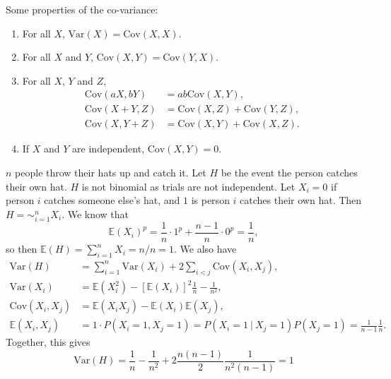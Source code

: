 \documentclass[letter-paper]{tufte-book}
\newenvironment{example}[1][Example]{\begin{trivlist}
\item[\hskip \labelsep {\bfseries #1}]}{\end{trivlist}}
\begin{document}
Some properties of the co-variance:
\begin{enumerate}
  \item For all $X$, $\mbox{Var}(X) = \mbox{Cov}(X,X)$.
  \item For all $X$ and $Y$, $\mbox{Cov}(X,Y) = \mbox{Cov}(Y,X)$.
  \item For all $X$, $Y$ and $Z$,
  \begin{align*}
    \mbox{Cov}(aX, bY) & = ab\mbox{Cov}(X,Y),\\
    \mbox{Cov}(X+Y, Z) & = \mbox{Cov}(X,Z) + \mbox{Cov}(Y,Z),\\
    \mbox{Cov}(X, Y+Z) & = \mbox{Cov}(X,Y) + \mbox{Cov}(X,Z).
  \end{align*}
  \item If $X$ and $Y$ are independent, $\mbox{Cov}(X,Y) = 0$.
\end{enumerate}

\begin{example}
  $n$ people throw their hats up and catch it. Let $H$ be the event the person
  catches their own hat. $H$ is not binomial as trials are not independent. Let
  $X_i = 0$ if person $i$ catches someone else's hat, and $1$ is person $i$
  catches their own hat. Then $H = \sim_{i=1}^n X_i$. We know that
  \begin{equation*}
    \mathbb{E}(X_i)^p = \frac{1}{n} \cdot 1^p + \frac{n-1}{n} \cdot 0^p
    = \frac{1}{n},
  \end{equation*}
  so then $\mathbb{E}(H) = \sum_{i=1}^n X_i = n/n = 1$. We also have
  \begin{align*}
    \mbox{Var}(H) 
      & = \sum_{i=1}^n \mbox{Var}(X_i) + 2\sum_{i<j}\mbox{Cov}(X_i, X_j), \\
    \mbox{Var}(X_i) 
      & = \mathbb{E}(X_i^2) - \left[\mathbb{E}(X_i)\right]^2
      \frac{1}{n} - \frac{1}{n^2}, \\
    \mbox{Cov}(X_i, X_j) 
      & = \mathbb{E}(X_i X_j) - \mathbb{E}(X_i)\mathbb{E}(X_j), \\
    \mathbb{E}(X_i, X_j) 
      & = 1\cdot P(X_i = 1, X_j = 1) = P(X_i = 1\ |\ X_j = 1)P(X_j = 1)
        = \frac{1}{n-1}\frac{1}{n}.
  \end{align*}
  Together, this gives
  \begin{equation*}
    \mbox{Var}(H) = \frac{1}{n} - \frac{1}{n^2} +
      2\frac{n(n-1)}{2}\frac{1}{n^2 (n-1)} = 1
  \end{equation*}
\end{example}
\end{document}
